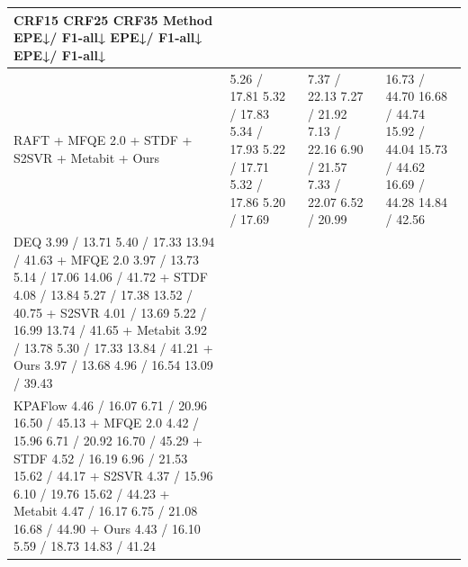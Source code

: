 \begin{tabular}{llll}
\toprule
CRF15 CRF25 CRF35 Method EPE↓/ F1-all↓ EPE↓/ F1-all↓ EPE↓/ F1-all↓ &  &  &  \\
\midrule
RAFT + MFQE 2.0 + STDF + S2SVR + Metabit + Ours & 5.26 / 17.81 5.32 / 17.83 5.34 / 17.93 5.22 / 17.71 5.32 / 17.86 5.20 / 17.69 & 7.37 / 22.13 7.27 / 21.92 7.13 / 22.16 6.90 / 21.57 7.33 / 22.07 6.52 / 20.99 & 16.73 / 44.70 16.68 / 44.74 15.92 / 44.04 15.73 / 44.62 16.69 / 44.28 14.84 / 42.56 \\
DEQ 3.99 / 13.71 5.40 / 17.33 13.94 / 41.63 + MFQE 2.0 3.97 / 13.73 5.14 / 17.06 14.06 / 41.72 + STDF 4.08 / 13.84 5.27 / 17.38 13.52 / 40.75 + S2SVR 4.01 / 13.69 5.22 / 16.99 13.74 / 41.65 + Metabit 3.92 / 13.78 5.30 / 17.33 13.84 / 41.21 + Ours 3.97 / 13.68 4.96 / 16.54 13.09 / 39.43 &  &  &  \\
KPAFlow 4.46 / 16.07 6.71 / 20.96 16.50 / 45.13 + MFQE 2.0 4.42 / 15.96 6.71 / 20.92 16.70 / 45.29 + STDF 4.52 / 16.19 6.96 / 21.53 15.62 / 44.17 + S2SVR 4.37 / 15.96 6.10 / 19.76 15.62 / 44.23 + Metabit 4.47 / 16.17 6.75 / 21.08 16.68 / 44.90 + Ours 4.43 / 16.10 5.59 / 18.73 14.83 / 41.24 &  &  &  \\
\bottomrule
\end{tabular}
